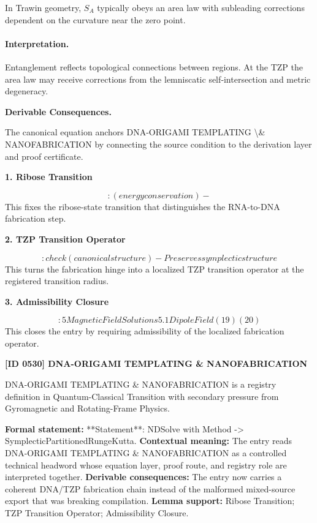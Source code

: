 In Trawin geometry, $S_A$ typically obeys an area law with subleading corrections dependent on the curvature near the zero point.

\paragraph{Interpretation.}

Entanglement reflects topological connections between regions.  At the TZP the area law may receive corrections from the lemniscatic self‑intersection and metric degeneracy.

\par\vspace{0.35em}
\noindent\textbf{Derivable Consequences.}\quad
\begingroup
\footnotesize
\raggedright
The canonical equation anchors DNA-ORIGAMI TEMPLATING \textbackslash{}\& NANOFABRICATION by connecting the source condition to the derivation layer and proof certificate.
\par\endgroup

\noindent\textbf{1. Ribose Transition}\par
\[
: (energy conservation) -
\]
\noindent This fixes the ribose-state transition that distinguishes the RNA-to-DNA fabrication step.\par
\noindent\textbf{2. TZP Transition Operator}\par
\[
: check (canonical structure) - Preserves symplectic structure
\]
\noindent This turns the fabrication hinge into a localized TZP transition operator at the registered transition radius.\par
\noindent\textbf{3. Admissibility Closure}\par
\[
: 5 Magnetic Field Solutions 5.1 Dipole Field (19) (20)
\]
\noindent This closes the entry by requiring admissibility of the localized fabrication operator.\par

\clearpage
\noindent\textbf{[ID 0530] DNA-ORIGAMI TEMPLATING \& NANOFABRICATION}\par
\vspace{0.35em}
\begingroup\small
{}
DNA-ORIGAMI TEMPLATING \& NANOFABRICATION is a registry definition in Quantum-Classical Transition with secondary pressure from Gyromagnetic and Rotating-Frame Physics.

\begingroup\footnotesize\setlength{\emergencystretch}{3em}\sloppy
\textbf{Formal statement:} **Statement**: NDSolve with Method -> SymplecticPartitionedRungeKutta. \textbf{Contextual meaning:} The entry reads DNA-ORIGAMI TEMPLATING \& NANOFABRICATION as a controlled technical headword whose equation layer, proof route, and registry role are interpreted together. \textbf{Derivable consequences:} The entry now carries a coherent DNA/TZP fabrication chain instead of the malformed mixed-source export that was breaking compilation. \textbf{Lemma support:} Ribose Transition; TZP Transition Operator; Admissibility Closure.\par
\endgroup

